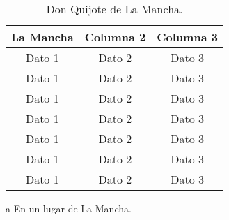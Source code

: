 \begin{table}[!ht]
  \caption{Don Quijote de La Mancha.}
  \centering
  \begin{threeparttable}
  \begin{tabular}{ccc}

  \toprule
  \textbf{La Mancha}\tnote{a} & \textbf{Columna 2} & \textbf{Columna 3}\\
  \midrule
  Dato 1             & Dato 2             & Dato 3\\
  Dato 1             & Dato 2             & Dato 3\\
  Dato 1             & Dato 2             & Dato 3\\
  Dato 1             & Dato 2             & Dato 3\\
  Dato 1             & Dato 2             & Dato 3\\
  Dato 1             & Dato 2             & Dato 3\\
  Dato 1             & Dato 2             & Dato 3\\
  \bottomrule

  \end{tabular}
  \begin{tablenotes}
    \item[a] En un lugar de La Mancha.
  \end{tablenotes}
  \end{threeparttable}
  \label{tab:donquijote}
\end{table}
